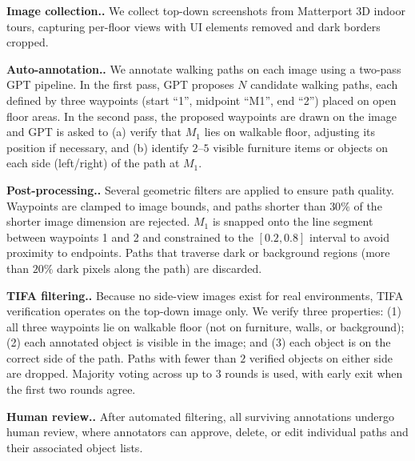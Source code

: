 \documentclass{llmxive}
\providecommand{\paragraph}[1]{\vspace{.5em}\noindent\textbf{#1.}}
\begin{document}
\paragraph{Image collection.}
We collect top-down screenshots from Matterport 3D indoor tours, capturing per-floor views with UI elements removed and dark borders cropped.

\paragraph{Auto-annotation.}
We annotate walking paths on each image using a two-pass GPT pipeline.
In the first pass, GPT proposes $N$ candidate walking paths, each defined by three waypoints (start ``1'', midpoint ``M1'', end ``2'') placed on open floor areas.
In the second pass, the proposed waypoints are drawn on the image and GPT is asked to (a) verify that $M_1$ lies on walkable floor, adjusting its position if necessary, and (b) identify $2$--$5$ visible furniture items or objects on each side (left/right) of the path at $M_1$.

\paragraph{Post-processing.}
Several geometric filters are applied to ensure path quality.
Waypoints are clamped to image bounds, and paths shorter than $30\%$ of the shorter image dimension are rejected.
$M_1$ is snapped onto the line segment between waypoints 1 and 2 and constrained to the $[0.2, 0.8]$ interval to avoid proximity to endpoints.
Paths that traverse dark or background regions (more than $20\%$ dark pixels along the path) are discarded.

\paragraph{TIFA filtering.}
Because no side-view images exist for real environments, TIFA verification operates on the top-down image only.
We verify three properties: (1) all three waypoints lie on walkable floor (not on furniture, walls, or background); (2) each annotated object is visible in the image; and (3) each object is on the correct side of the path.
Paths with fewer than $2$ verified objects on either side are dropped.
Majority voting across up to $3$ rounds is used, with early exit when the first two rounds agree.

\paragraph{Human review.}
After automated filtering, all surviving annotations undergo human review, where annotators can approve, delete, or edit individual paths and their associated object lists.
\end{document}
